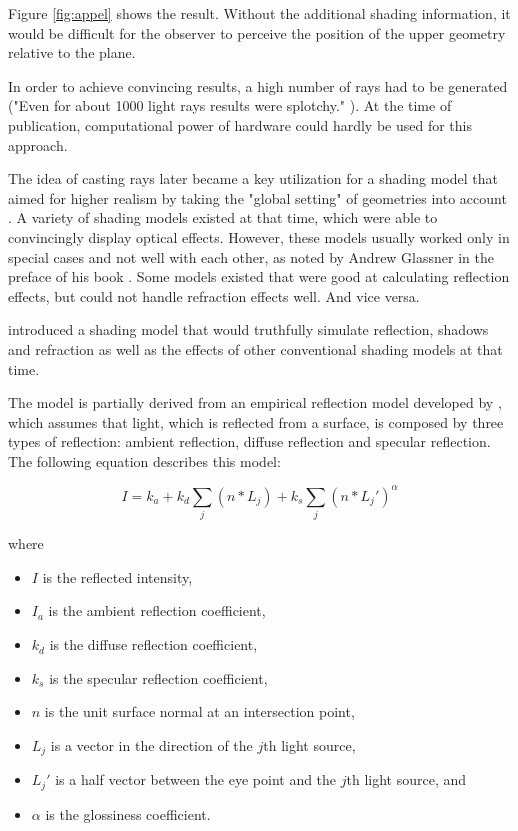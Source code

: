 Figure \ref{fig:appel} shows the result. Without the additional shading information, it would be difficult for the observer to perceive the position of the upper geometry relative to the plane.

In order to achieve convincing results, a high number of rays had to be generated ("Even for about 1000 light rays results were splotchy." \cite[p 3]{appel1968some}). At the time of publication, computational power of hardware could hardly be used for this approach.

The idea of casting rays later became a key utilization for a shading model that aimed for higher realism by taking the "global setting" of geometries into account \cite{whitted1979improved}. A variety of shading models existed at that time, which were able to convincingly display optical effects. However, these models usually worked only in special cases and not well with each other, as noted by Andrew Glassner in the preface of his book  \cite{glassner1989introduction}. Some models existed that were good at calculating reflection effects, but could not handle refraction effects well. And vice versa. 

\cite{whitted1979improved} introduced a shading model that would truthfully simulate reflection, shadows and refraction as well as the effects of other conventional shading models at that time.  

The model is partially derived from an empirical reflection model developed by \cite{phong1975illumination}, which assumes that light, which is reflected from a surface, is composed by three types of reflection: ambient reflection, diffuse reflection and specular reflection. The following equation describes this model:

\begin{equation} \label{eq:phong}
I = k_{a} + k_{d}\sum_{j}(n*L_{j}) + k_{s}\sum_{j}(n*L_{j}\prime)^{\alpha}
\end{equation}

\noindent where
\begin{itemize}
	\setlength\itemsep{0.05em}
	\item  $I$ is the reflected intensity,
	\item  $I_{a}$ is the ambient reflection coefficient,
	\item  $k_{d}$ is the diffuse reflection coefficient,
	\item  $k_{s}$ is the specular reflection coefficient,
	\item  $n$ is the unit surface normal at an intersection point,
	\item  $L_{j}$ is a vector in the direction of the $j$th light source,
	\item  $L_{j}\prime$ is a half vector between the eye point and the $j$th light source, and
	\item  $\alpha$ is the glossiness coefficient.
\end{itemize}

